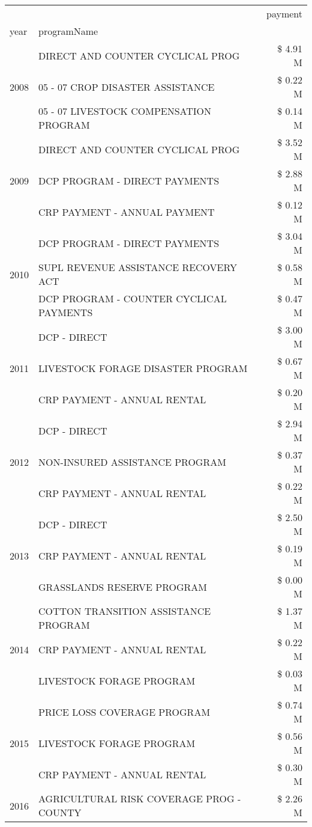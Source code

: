 \begin{tabular}{llr}
\toprule
 &  & payment \\
year & programName &  \\
\midrule
\multirow[t]{3}{*}{2008} & DIRECT AND COUNTER CYCLICAL PROG & \$ 4.91 M \\
 & 05 - 07 CROP DISASTER ASSISTANCE & \$ 0.22 M \\
 & 05 - 07 LIVESTOCK COMPENSATION PROGRAM & \$ 0.14 M \\
\cline{1-3}
\multirow[t]{3}{*}{2009} & DIRECT AND COUNTER CYCLICAL PROG & \$ 3.52 M \\
 & DCP PROGRAM - DIRECT PAYMENTS & \$ 2.88 M \\
 & CRP PAYMENT - ANNUAL PAYMENT & \$ 0.12 M \\
\cline{1-3}
\multirow[t]{3}{*}{2010} & DCP PROGRAM - DIRECT PAYMENTS & \$ 3.04 M \\
 & SUPL REVENUE ASSISTANCE RECOVERY ACT & \$ 0.58 M \\
 & DCP PROGRAM - COUNTER CYCLICAL PAYMENTS & \$ 0.47 M \\
\cline{1-3}
\multirow[t]{3}{*}{2011} & DCP - DIRECT & \$ 3.00 M \\
 & LIVESTOCK FORAGE DISASTER PROGRAM & \$ 0.67 M \\
 & CRP PAYMENT - ANNUAL RENTAL & \$ 0.20 M \\
\cline{1-3}
\multirow[t]{3}{*}{2012} & DCP - DIRECT & \$ 2.94 M \\
 & NON-INSURED ASSISTANCE PROGRAM & \$ 0.37 M \\
 & CRP PAYMENT - ANNUAL RENTAL & \$ 0.22 M \\
\cline{1-3}
\multirow[t]{3}{*}{2013} & DCP - DIRECT & \$ 2.50 M \\
 & CRP PAYMENT - ANNUAL RENTAL & \$ 0.19 M \\
 & GRASSLANDS RESERVE PROGRAM & \$ 0.00 M \\
\cline{1-3}
\multirow[t]{3}{*}{2014} & COTTON TRANSITION ASSISTANCE PROGRAM & \$ 1.37 M \\
 & CRP PAYMENT - ANNUAL RENTAL & \$ 0.22 M \\
 & LIVESTOCK FORAGE PROGRAM & \$ 0.03 M \\
\cline{1-3}
\multirow[t]{3}{*}{2015} & PRICE LOSS COVERAGE PROGRAM & \$ 0.74 M \\
 & LIVESTOCK FORAGE PROGRAM & \$ 0.56 M \\
 & CRP PAYMENT - ANNUAL RENTAL & \$ 0.30 M \\
\cline{1-3}
\multirow[t]{3}{*}{2016} & AGRICULTURAL RISK COVERAGE PROG - COUNTY & \$ 2.26 M \\

\end{tabular}
